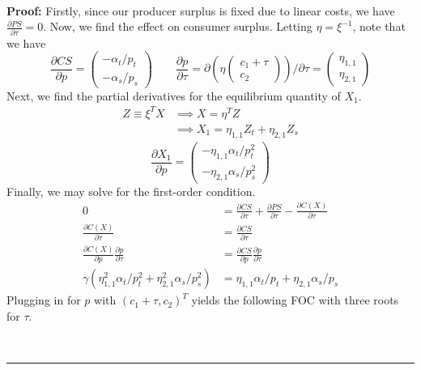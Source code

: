 \documentclass[12pt,a4paper]{extarticle}
\newenvironment{proof}[1][Proof]{\noindent\textbf{#1:} }{\ \rule{0.5em}{0.5em}}
\begin{document}
\hfill \\
\begin{proof}
Firstly, since our producer surplus is fixed due to linear costs, we have $\frac{\partial PS}{\partial \tau} = 0$. Now, we find the effect on consumer surplus. Letting $\eta = \xi^{-1}$, note that we have
$$\frac{\partial CS}{\partial p} = 
\begin{pmatrix}
-\alpha_t / p_t \\
-\alpha_s / p_s
\end{pmatrix}
\qquad
\frac{\partial p}{\partial \tau} =
\partial
\left( 
\eta
\begin{pmatrix}
c_1 + \tau \\
c_2
\end{pmatrix}
\right)
/ \partial \tau
=
\begin{pmatrix}
\eta_{1,1} \\
\eta_{2,1}
\end{pmatrix}
$$
Next, we find the partial derivatives for the equilibrium quantity of $X_1$. 
\begin{align*}
Z \equiv \xi^T X &\implies X = \eta^T Z \\
&\implies X_1 = \eta_{1,1} Z_t + \eta_{2,1} Z_s 
\end{align*}
$$\frac{\partial X_1}{\partial p} = 
\begin{pmatrix}
-\eta_{1,1} \alpha_t / p_t^2 \\
- \eta_{2,1} \alpha_s / p_s^2 
\end{pmatrix}
$$
Finally, we may solve for the first-order condition.
\begin{align*}
0 &= \frac{\partial CS}{\partial \tau} + \frac{\partial PS}{\partial \tau} - \frac{\partial C(X)}{\partial \tau}\\
\frac{\partial C(X)}{\partial \tau} &= \frac{\partial CS}{\partial \tau}\\
\frac{ \partial  C(X)}{\partial p} \frac{\partial p}{\partial \tau}  &= \frac{\partial CS}{\partial p} \frac{\partial p}{\partial \tau}\\
\gamma \left( \eta_{1,1}^2 \alpha_t / p_t^2 + \eta_{2,1}^2 \alpha_s / p_s^2 \right) &= \eta_{1,1} \alpha_t /p_t + \eta_{2,1} \alpha_s / p_s
\end{align*}
Plugging in for $p$ with $(c_1 + \tau, c_2)^T$ yields the following FOC with three roots for $\tau$. 


\end{proof}
\end{document}
